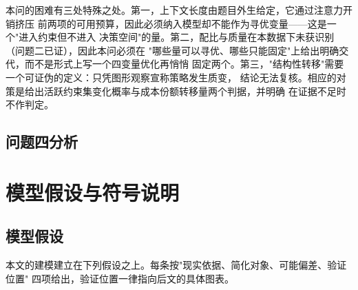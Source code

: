 \documentclass[bwprint]{gmcmthesis}
\numberwithin{equation}{section}
\numberwithin{figure}{section}
\numberwithin{table}{section}
\begin{document}
本问的困难有三处特殊之处。第一，上下文长度由题目外生给定，它通过注意力开销挤压
前两项的可用预算，因此必须纳入模型却不能作为寻优变量——这是一个"进入约束但不进入
决策空间"的量。第二，配比与质量在本数据下未获识别（问题二已证），因此本问必须在
"哪些量可以寻优、哪些只能固定"上给出明确交代，而不是形式上写一个四变量优化再悄悄
固定两个。第三，"结构性转移"需要一个可证伪的定义：只凭图形观察宣称策略发生质变，
结论无法复核。相应的对策是给出活跃约束集变化概率与成本份额转移量两个判据，并明确
在证据不足时不作判定。

\subsection{问题四分析}


\section{模型假设与符号说明}

\subsection{模型假设}

本文的建模建立在下列假设之上。每条按"现实依据、简化对象、可能偏差、验证位置"
四项给出，验证位置一律指向后文的具体图表。
\end{document}
